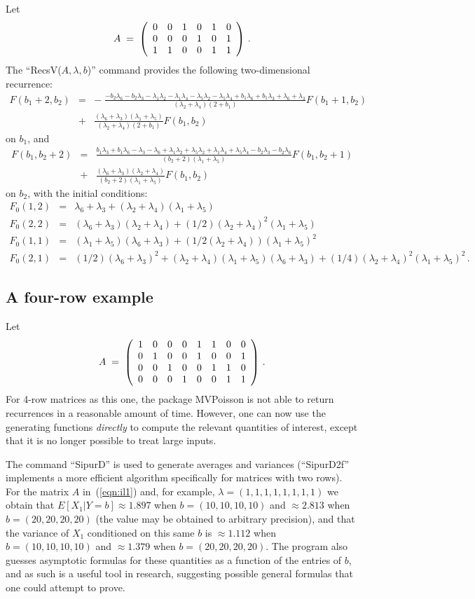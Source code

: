 \documentclass[11pt]{article}
\newcommand{\be}[1]{\begin{equation}\label{#1}}
\newcommand{\ee}{\end{equation}}
\newcommand{\beqn}{\begin{eqnarray*}}
\newcommand{\eeqn}{\end{eqnarray*}}
\newcommand{\mypmatrix}[1]{\left(\begin{array}{cccccccccccc}#1\end{array}\right)}
\begin{document}
Let
\be{eqn:Aenzymes}
A\;=\;
\mypmatrix{
0& 0& 1& 0& 1& 0 \cr
0& 0& 0& 1& 0& 1 \cr
1& 1& 0& 0& 1& 1 }\,.
\ee
The ``RecsV($A, \lambda , b$)'' command provides the following two-dimensional
recurrence:
\beqn
F(b_1+2, b_2)
&=&
-\;
\frac{-b_2\lambda _6-b_2\lambda _3-\lambda _1\lambda _2-\lambda _1\lambda _4-\lambda _5\lambda _2-\lambda _5\lambda _4+b_1\lambda _6+b_1\lambda _3+\lambda _6+\lambda _3}{(\lambda _2+\lambda _4)(2+b_1)}
F(b_1+1, b_2)
\\
&+&
\frac{(\lambda _6+\lambda _3)(\lambda _1+\lambda _5)}{(\lambda _2+\lambda _4)(2+b_1)}
F(b_1, b_2)
\eeqn
on $b_1$, and
\beqn
F(b_1, b_2+2)
&=&
\frac{b_1\lambda _3+b_1\lambda _6-\lambda _3-\lambda _6+\lambda _1\lambda _2+\lambda _5\lambda _2+\lambda _1\lambda _4+\lambda _5\lambda _4-b_2\lambda _3-b_2\lambda _6}{(b_2+2)(\lambda _1+\lambda _5)}
F(b_1, b_2+1)
\\
&+&
\frac{(\lambda _6+\lambda _3)(\lambda _2+\lambda _4)}{(b_2+2)(\lambda _1+\lambda _5)}
F(b_1, b_2)
\eeqn
on $b_2$, 
with the initial conditions:
\beqn
F_0(1,2) &=&\lambda _6+\lambda _3+(\lambda _2+\lambda _4)(\lambda _1+\lambda _5)
\\
F_0(2,2) &=&(\lambda _6+\lambda _3)(\lambda _2+\lambda _4)+(1/2)(\lambda _2+\lambda _4)^2(\lambda _1+\lambda _5)
\\
F_0(1,1) &=&(\lambda _1+\lambda _5)(\lambda _6+\lambda _3)+(1/2(\lambda _2+\lambda _4))(\lambda _1+\lambda _5)^2
\\
F_0(2,1) &=&(1/2)(\lambda _6+\lambda _3)^2+(\lambda _2+\lambda _4)(\lambda _1+\lambda _5)(\lambda _6+\lambda _3)+(1/4)(\lambda _2+\lambda _4)^2(\lambda _1+\lambda _5)^2\,.
\eeqn


\subsection{A four-row example}

Let
\be{eqn:il1}
A\;=\;\mypmatrix{
1&0&0&0&1&1&0&0\cr
0&1&0&0&1&0&0&1\cr
0&0&1&0&0&1&1&0\cr
0&0&0&1&0&0&1&1}\,.
\ee
For 4-row matrices as this one, the package MVPoisson is not able to return
recurrences in a reasonable amount of time. However, one can now use the
generating functions {\it directly} to compute the relevant quantities of
interest, except that it is no longer possible to treat large inputs.

The command ``SipurD'' is used to generate averages and variances 
(``SipurD2f'' implements a more efficient algorithm specifically for
matrices with two rows).
For the matrix $A$ in~(\ref{eqn:il1}) and, for example, $\lambda =(1,1,1,1,1,1,1,1)$
we obtain that
$E[X_1|Y=b] \approx 1.897$ when $b=(10,10,10,10)$ 
and $\approx 2.813$ when $b=(20,20,20,20)$ 
(the value may be obtained to arbitrary precision),
and that the variance
of $X_1$ conditioned on this same $b$ is $\approx 1.112$ when $b=(10,10,10,10)$ 
and $\approx 1.379$ when $b=(20,20,20,20)$.
The program also guesses asymptotic formulas for these quantities
as a function of the entries of $b$, and as such is a useful tool
in research, suggesting possible general formulas that one could attempt to
prove.
\end{document}
